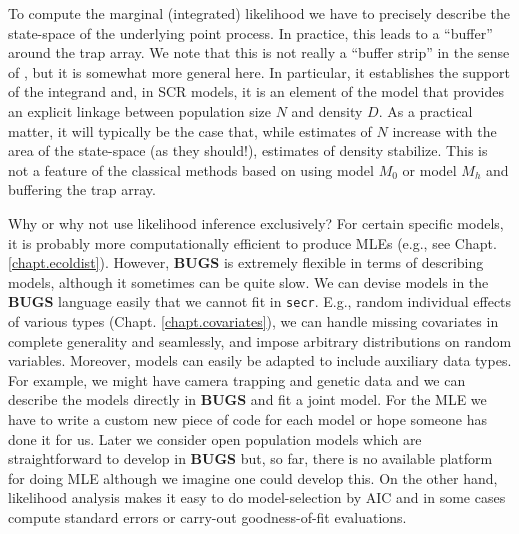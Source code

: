 To compute the marginal (integrated) likelihood we have to precisely describe the
state-space of the underlying point process. In practice, this leads
to a ``buffer'' around the trap array. We note that this is not really a
``buffer strip'' in the sense of \citet{wilson_anderson:1985a},  
but it is somewhat more general here. In particular,
it establishes the support of the integrand and, 
in SCR models, it is an element of the model that
provides an explicit
linkage between population size $N$ and density $D$.
As a practical 
matter, it will typically be the case that, while estimates of $N$
increase with the area of the state-space (as they should!), estimates of density
stabilize. This is not a feature of the classical methods based on
using model $M_0$ or model $M_h$ and buffering the trap array.

Why or why not use likelihood inference exclusively? For certain
specific models, it is probably more computationally efficient to
produce MLEs (e.g., see Chapt. \ref{chapt.ecoldist}). However, {\bf BUGS} is extremely flexible in terms of
describing models, although it sometimes can be quite slow. We can
devise models in the {\bf BUGS} language easily that we cannot fit in
\mbox{\tt secr}. E.g.,
random individual effects of various types
(Chapt. \ref{chapt.covariates}), we can 
handle missing covariates in complete generality and seamlessly, and
impose arbitrary distributions on random variables. Moreover, models
can easily be adapted to include auxiliary data types. For example, we
might have camera trapping and genetic data and we can describe the
models directly in {\bf BUGS} and fit a joint model. For the MLE we have
to write a custom new piece of code for each model or hope someone has
done it for us.  Later we consider open population models which are
straightforward to develop in {\bf BUGS} but, so far, there is no
available platform for doing MLE although we imagine one could develop
this.  On
the other hand, likelihood analysis makes it easy to do
model-selection by AIC and in some cases compute standard errors or
carry-out goodness-of-fit evaluations. 
\begin{comment}
Another thing that is more conceptual here is non-CSR point
processes (Chapt. \ref{chapt.state-space}) and generating predictions of how many
individuals have home range centers in any particular polygon.  Basic
benefits of Bayesian analysis have been discussed elsewhere (XXXXXXXX Chapter
2? BPA book? Link and Barker?) and we believe these are compelling.
\end{comment}

